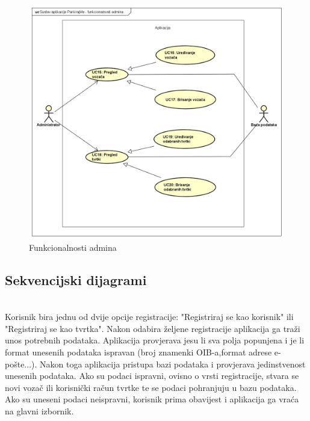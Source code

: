 					\begin{figure}[H]
						\includegraphics[scale=0.5]{dijagrami/funkcionalnosti_admina.png} %
						\centering
						\caption{Funkcionalnosti admina}
						\label{fig:promjene}
					\end{figure}				
				\eject		
				
			\subsection{Sekvencijski dijagrami}
				
				
				\\
				Korisnik bira jednu od dvije opcije registracije: "Registriraj se kao korisnik" ili "Registriraj se kao tvrtka". Nakon odabira željene registracije aplikacija ga traži unos potrebnih podataka. Aplikacija provjerava jesu li sva polja popunjena i je li format unesenih podataka ispravan (broj znamenki OIB-a,format adrese e-pošte...). Nakon toga aplikacija pristupa bazi podataka i provjerava jedinstvenost unesenih podataka. Ako su podaci ispravni, ovisno o vrsti registracije, stvara se novi vozač ili korisnički račun tvrtke te se podaci pohranjuju u bazu podataka. Ako su uneseni podaci neispravni, korisnik prima obavijest i aplikacija ga vraća na glavni izbornik.
	

